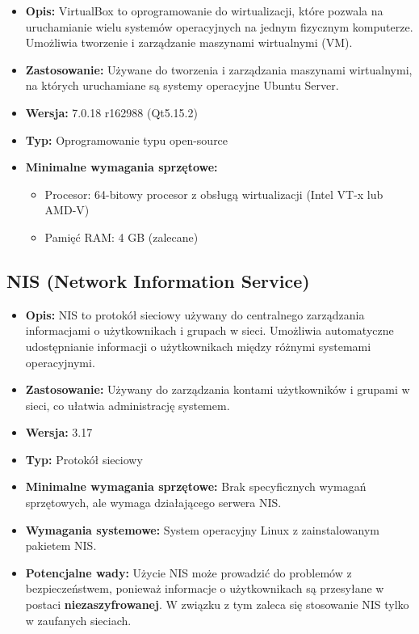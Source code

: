 \begin{itemize}
    \item \textbf{Opis:} VirtualBox\cite{VirtualBox} to oprogramowanie do wirtualizacji, które pozwala na uruchamianie wielu systemów operacyjnych na jednym fizycznym komputerze. Umożliwia tworzenie i zarządzanie maszynami wirtualnymi (VM).
    \item \textbf{Zastosowanie:} Używane do tworzenia i zarządzania maszynami wirtualnymi, na których uruchamiane są systemy operacyjne Ubuntu Server.
    \item \textbf{Wersja:} 7.0.18 r162988 (Qt5.15.2)
    \item \textbf{Typ:} Oprogramowanie typu open-source
    \item \textbf{Minimalne wymagania sprzętowe:}
    \begin{itemize}
        \item Procesor: 64-bitowy procesor z obsługą wirtualizacji (Intel VT-x lub AMD-V)
        \item Pamięć RAM: 4 GB (zalecane)
    \end{itemize}
\end{itemize}
\subsection{NIS (Network Information Service)}
\begin{itemize}
    \item \textbf{Opis:} NIS to protokół sieciowy używany do centralnego zarządzania informacjami o użytkownikach i grupach w sieci. Umożliwia automatyczne udostępnianie informacji o użytkownikach między różnymi systemami operacyjnymi.
    \item \textbf{Zastosowanie:} Używany do zarządzania kontami użytkowników i grupami w sieci, co ułatwia administrację systemem.
    \item \textbf{Wersja:} 3.17
    \item \textbf{Typ:} Protokół sieciowy
    \item \textbf{Minimalne wymagania sprzętowe:} Brak specyficznych wymagań sprzętowych, ale wymaga działającego serwera NIS.
    \item \textbf{Wymagania systemowe:} System operacyjny Linux z zainstalowanym pakietem NIS.
    \item \textbf{Potencjalne wady:} Użycie NIS może prowadzić do problemów z bezpieczeństwem, ponieważ informacje o użytkownikach są przesyłane w postaci \textbf{niezaszyfrowanej}. W związku z tym zaleca się stosowanie NIS tylko w zaufanych sieciach.
\end{itemize}

